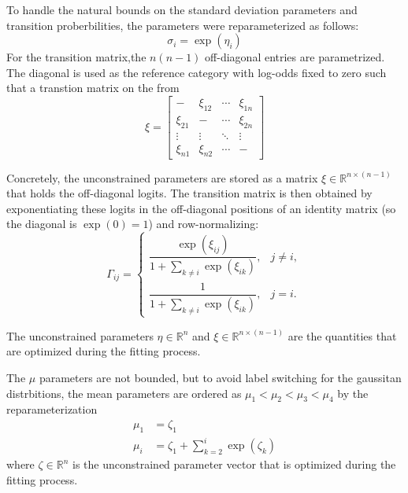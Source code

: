To handle the natural bounds on the standard deviation parameters and transition proberbilities, the parameters
were reparameterized as follows:
\begin{equation}
    \sigma_i = \exp(\eta_i)
    \label{eq:sigma_reparam}
\end{equation}
For the transition matrix,the $n(n-1)$ off-diagonal entries are
parametrized. The diagonal is used as the reference category with
log-odds fixed to zero such that a transtion matrix on the from
\begin{equation}
    \xi = \begin{bmatrix}
        - & \xi_{12} & \cdots & \xi_{1n} \\
        \xi_{21} & - & \cdots & \xi_{2n} \\
        \vdots & \vdots & \ddots & \vdots \\
        \xi_{n1} & \xi_{n2} & \cdots & -  
    \end{bmatrix}
\end{equation}

Concretely, the unconstrained parameters are
stored as a matrix $\xi \in \mathbb{R}^{n \times (n-1)}$ that holds the
off-diagonal logits. The transition matrix is then obtained by
exponentiating these logits in the off-diagonal positions of an
identity matrix (so the diagonal is $\exp(0) = 1$) and row-normalizing:
\begin{equation}
    \Gamma_{ij} =
    \begin{cases}
    \dfrac{\exp(\xi_{ij})}{1 + \sum_{k \neq i} \exp(\xi_{ik})}, & j \neq i, \\[6pt]
    \dfrac{1}{1 + \sum_{k \neq i} \exp(\xi_{ik})}, & j = i.
    \end{cases}
    \label{eq:gamma_softmax}
\end{equation}

The unconstrained parameters $\eta \in \mathbb{R}^n$ and
$\xi \in \mathbb{R}^{n \times (n-1)}$ are the quantities that are
optimized during the fitting process. \newline

The $\mu$ parameters are not bounded, but to avoid label switching for 
the gaussitan distrbitions, the mean parameters are ordered as $\mu_1 < \mu_2 < \mu_3 < \mu_4$ by the reparameterization
\begin{equation}
    \begin{aligned}
        \mu_1 &= \zeta_1 \\
        \mu_i &= \zeta_1 + \sum_{k=2}^{i} \exp(\zeta_k)
    \end{aligned}
    \label{eq:mu_reparam}
\end{equation}
where $\zeta \in \mathbb{R}^n$ is the unconstrained parameter vector that is optimized during the fitting process. \newline


